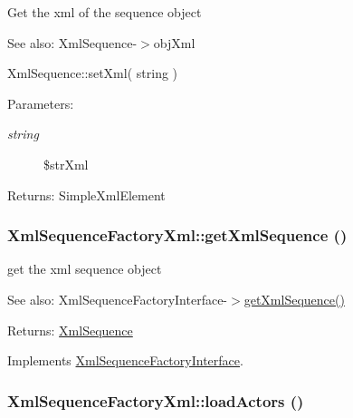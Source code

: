 Get the xml of the sequence object

\begin{Desc}
\item[See also:]XmlSequence-$>$objXml 

XmlSequence::setXml( string ) \end{Desc}
\begin{Desc}
\item[Parameters:]
\begin{description}
\item[{\em string}]\$strXml \end{description}
\end{Desc}
\begin{Desc}
\item[Returns:]SimpleXmlElement \end{Desc}
\hypertarget{class_xml_sequence_factory_xml_fba8de983895bb05857d75f9b26dd71a}{
\subsubsection[{getXmlSequence}]{\setlength{\rightskip}{0pt plus 5cm}XmlSequenceFactoryXml::getXmlSequence ()}}
\label{class_xml_sequence_factory_xml_fba8de983895bb05857d75f9b26dd71a}


get the xml sequence object

\begin{Desc}
\item[See also:]XmlSequenceFactoryInterface-$>$\hyperlink{class_xml_sequence_factory_xml_fba8de983895bb05857d75f9b26dd71a}{getXmlSequence()} \end{Desc}
\begin{Desc}
\item[Returns:]\hyperlink{class_xml_sequence}{XmlSequence} \end{Desc}


Implements \hyperlink{interface_xml_sequence_factory_interface_a6f31a5f6a768055644ddb62d101cbb6}{XmlSequenceFactoryInterface}.\hypertarget{class_xml_sequence_factory_xml_7142e97b8bdea80ec8a3a72f1dbed6d8}{
\subsubsection[{loadActors}]{\setlength{\rightskip}{0pt plus 5cm}XmlSequenceFactoryXml::loadActors ()}}
\label{class_xml_sequence_factory_xml_7142e97b8bdea80ec8a3a72f1dbed6d8}


